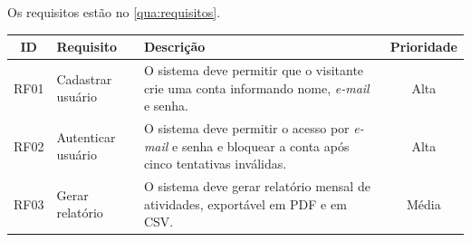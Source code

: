 \documentclass[12pt, a4paper, brazilian]{abntex2}
\begin{document}
Os requisitos estão no \autoref{qua:requisitos}.

\begin{quadro}[htbp]
  \caption{Requisitos funcionais do sistema (exemplo)}\label{qua:requisitos}
  \renewcommand{\arraystretch}{1.25}
  \begin{tabularx}{\textwidth}{|c|>{\raggedright\arraybackslash}p{3.6cm}|X|c|}
    \hline
    \textbf{ID} & \textbf{Requisito}
      & \textbf{Descrição}
      & \textbf{Prioridade} \\
    \hline
    RF01 & Cadastrar usuário
      & O sistema deve permitir que o visitante crie uma conta informando
        nome, \emph{e-mail} e senha.
      & Alta \\
    \hline
    RF02 & Autenticar usuário
      & O sistema deve permitir o acesso por \emph{e-mail} e senha e
        bloquear a conta após cinco tentativas inválidas.
      & Alta \\
    \hline
    RF03 & Gerar relatório
      & O sistema deve gerar relatório mensal de atividades, exportável em
        PDF e em CSV.
      & Média \\
    \hline
  \end{tabularx}
\end{quadro}
\end{document}
